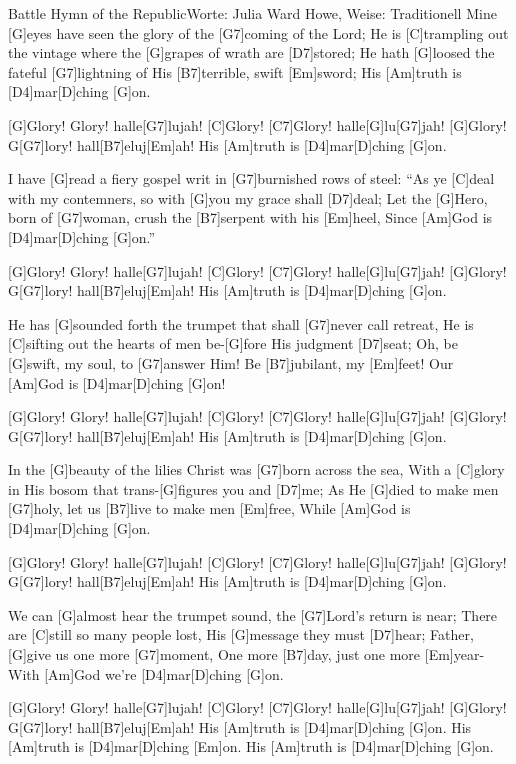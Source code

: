 \documentclass[../main.tex]{subfiles}
\begin{document}
\begin{song}{Battle Hymn of the Republic}{Worte: Julia Ward Howe, Weise: Traditionell}{}
Mine [G]eyes have seen the glory of the [G7]coming of the Lord;
He is [C]trampling out the vintage where the [G]grapes of wrath are [D7]stored;
He hath [G]loosed the fateful [G7]lightning of His [B7]terrible, swift [Em]sword;
His [Am]truth is [D4]mar[D]ching [G]on.

[G]Glory! Glory! halle[G7]lujah! [C]Glory! [C7]Glory! halle[G]lu[G7]jah!
[G]Glory! G[G7]lory! hall[B7]eluj[Em]ah!  His [Am]truth is [D4]mar[D]ching [G]on.

I have [G]read a fiery gospel writ in [G7]burnished rows of steel:
``As ye [C]deal with my contemners, so with [G]you my grace shall [D7]deal;
Let the [G]Hero, born of [G7]woman, crush the [B7]serpent with his [Em]heel,
Since [Am]God is [D4]mar[D]ching [G]on.''

[G]Glory! Glory! halle[G7]lujah! [C]Glory! [C7]Glory! halle[G]lu[G7]jah!
[G]Glory! G[G7]lory! hall[B7]eluj[Em]ah!  His [Am]truth is [D4]mar[D]ching [G]on.

He has [G]sounded forth the trumpet that shall [G7]never call retreat,
He is [C]sifting out the hearts of men be-[G]fore His judgment [D7]seat;
Oh, be [G]swift, my soul, to [G7]answer Him!  Be [B7]jubilant, my [Em]feet!
Our [Am]God is [D4]mar[D]ching [G]on!

[G]Glory! Glory! halle[G7]lujah! [C]Glory! [C7]Glory! halle[G]lu[G7]jah!
[G]Glory! G[G7]lory! hall[B7]eluj[Em]ah!  His [Am]truth is [D4]mar[D]ching [G]on.

In the [G]beauty of the lilies Christ was [G7]born across the sea,
With a [C]glory in His bosom that trans-[G]figures you and [D7]me;
As He [G]died to make men [G7]holy, let us [B7]live to make men [Em]free,
While [Am]God is [D4]mar[D]ching [G]on.

[G]Glory! Glory! halle[G7]lujah! [C]Glory! [C7]Glory! halle[G]lu[G7]jah!
[G]Glory! G[G7]lory! hall[B7]eluj[Em]ah!  His [Am]truth is [D4]mar[D]ching [G]on.

We can [G]almost hear the trumpet sound, the [G7]Lord's return is near;
There are [C]still so many people lost, His [G]message they must [D7]hear;
Father, [G]give us one more [G7]moment, One more [B7]day, just one more [Em]year-
With [Am]God we're [D4]mar[D]ching [G]on.

[G]Glory! Glory! halle[G7]lujah! [C]Glory! [C7]Glory! halle[G]lu[G7]jah!
[G]Glory! G[G7]lory! hall[B7]eluj[Em]ah!  His [Am]truth is [D4]mar[D]ching [G]on.
His [Am]truth is [D4]mar[D]ching [Em]on.   His [Am]truth is [D4]mar[D]ching [G]on.

\end{song}
\end{document}
